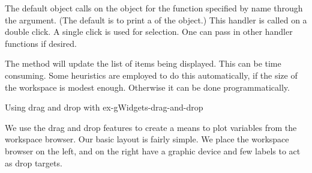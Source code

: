 The default  object calls
 on the object for the function specified by name
through the  argument. (The default is
to print a  of the object.) This handler is called on a
double click. A single click is used for selection. One can pass in
other handler functions if desired.  


The  method will update the list of items
being displayed.  This can be time consuming. Some heuristics
are employed to do this automatically, if the size of the workspace is
modest enough. Otherwise it can be done programmatically.

\begin{example}{Using drag and drop with }{ex-gWidgets-drag-and-drop}

We use the drag and drop features to create a means to plot variables
from the workspace browser.  Our basic layout is fairly simple. We
place the workspace browser on the left, and on the right have a
graphic device and few labels to act as drop targets.


\end{example}
